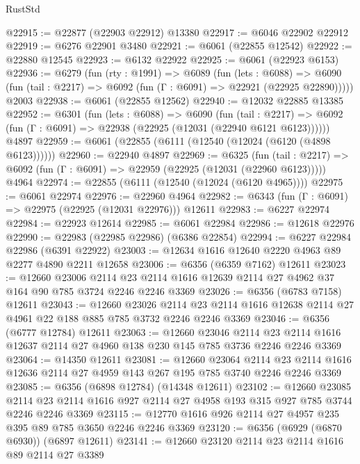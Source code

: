\begin{lexlean}{RustStd}
\begin{coremodule}
@22915 := @22877 (@22903 @22912) @13380
@22917 := @6046 @22902 @22912
@22919 := @6276 @22901 @3480
@22921 := @6061 (@22855 @12542)
@22922 := @22880 @12545
@22923 := @6132 @22922
@22925 := @6061 (@22923 @6153)
@22936 := @6279
    (fun (rty : @1991) =>
    @6089
      (fun (lets : @6088) =>
      @6090 (fun (tail : @2217) => @6092 (fun (Γ : @6091) => @22921 (@22925 @22890)))))
    @2003
@22938 := @6061 (@22855 @12562)
@22940 := @12032 @22885 @13385
@22952 := @6301
    (fun (lets : @6088) =>
    @6090
      (fun (tail : @2217) =>
      @6092 (fun (Γ : @6091) => @22938 (@22925 (@12031 (@22940 @6121 @6123))))))
    @4897
@22959 := @6061 (@22855 (@6111 (@12540 (@12024 (@6120 (@4898 @6123))))))
@22960 := @22940 @4897
@22969 := @6325
    (fun (tail : @2217) => @6092 (fun (Γ : @6091) => @22959 (@22925 (@12031 (@22960 @6123)))))
    @4964
@22974 := @22855 (@6111 (@12540 (@12024 (@6120 @4965))))
@22975 := @6061 @22974
@22976 := @22960 @4964
@22982 := @6343 (fun (Γ : @6091) => @22975 (@22925 (@12031 @22976))) @12611
@22983 := @6227 @22974
@22984 := @22923 @12614
@22985 := @6061 @22984
@22986 := @12618 @22976
@22990 := @22983 (@22985 @22986) (@6386 @22854)
@22994 := @6227 @22984 @22986 (@6391 @22922)
@23003 := @12634 @1616 @12640 @2220 @4963 @89 @2277 @4890 @2211 @12658
@23006 := @6356 (@6359 @7162) @12611
@23023 := @12660
    @23006
    @2114
    @23
    @2114
    @1616
    @12639
    @2114
    @27
    @4962
    @37
    @164
    @90
    @785
    @3724
    @2246
    @2246
    @3369
@23026 := @6356 (@6783 @7158) @12611
@23043 := @12660
    @23026
    @2114
    @23
    @2114
    @1616
    @12638
    @2114
    @27
    @4961
    @22
    @188
    @885
    @785
    @3732
    @2246
    @2246
    @3369
@23046 := @6356 (@6777 @12784) @12611
@23063 := @12660
    @23046
    @2114
    @23
    @2114
    @1616
    @12637
    @2114
    @27
    @4960
    @138
    @230
    @145
    @785
    @3736
    @2246
    @2246
    @3369
@23064 := @14350 @12611
@23081 := @12660
    @23064
    @2114
    @23
    @2114
    @1616
    @12636
    @2114
    @27
    @4959
    @143
    @267
    @195
    @785
    @3740
    @2246
    @2246
    @3369
@23085 := @6356 (@6898 @12784) (@14348 @12611)
@23102 := @12660
    @23085
    @2114
    @23
    @2114
    @1616
    @927
    @2114
    @27
    @4958
    @193
    @315
    @927
    @785
    @3744
    @2246
    @2246
    @3369
@23115 := @12770 @1616 @926 @2114 @27 @4957 @235 @395 @89 @785 @3650 @2246 @2246 @3369
@23120 := @6356 (@6929 (@6870 @6930)) (@6897 @12611)
@23141 := @12660
    @23120
    @2114
    @23
    @2114
    @1616
    @89
    @2114
    @27
    @3389

\end{coremodule}
\end{lexlean}
